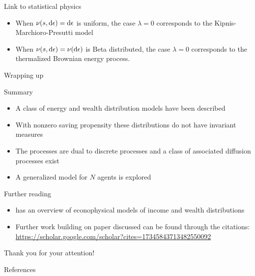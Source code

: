 \documentclass[9pt]{beamer}
\begin{document}
\begin{frame}{Link to statistical physics}
\begin{itemize}
    \item When $\nu(s, \mathop{}\!\mathrm{d} \epsilon) = \mathop{}\!\mathrm{d}\epsilon$ is uniform, the case $\lambda=0$ corresponds to the Kipnis-Marchioro-Presutti model
    \item When $\nu(s, \mathop{}\!\mathrm{d} \epsilon) = \nu(\mathop{}\!\mathrm{d}\epsilon)$ is Beta distributed, the case $\lambda=0$ corresponds to the thermalized Brownian energy process.
\end{itemize}
\end{frame}




\begin{frame}{Wrapping up}
  \begin{block}{Summary}
    \begin{itemize}
    \item A class of energy and wealth distribution models have been described
    \item With nonzero saving propensity these distributions do not have invariant measures
    \item The processes are dual to discrete processes and a class of associated diffusion processes exist
    \item A generalized model for $N$ agents is explored
    \end{itemize}
  \end{block}
  \begin{block}{Further reading}
    \begin{itemize}
    \item {} has an overview of econophysical models of income and wealth distributions
    \item Further work building on paper discussed can be found through the citations: \url{https://scholar.google.com/scholar?cites=17345843713482550092}
    \end{itemize}
  \end{block}
  \pause
  \begin{center}
  \huge{
  Thank you for your attention!
  }
  \end{center}
\end{frame}

\begin{frame}[allowframebreaks]{References}

%   
%   
  \printbibliography
\end{frame}
\end{document}
